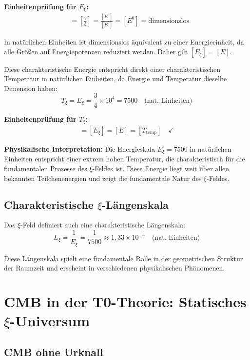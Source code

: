 \documentclass[12pt,a4paper]{article}
\begin{document}
	\textbf{Einheitenprüfung für $E_\xi$:}
	\begin{align}
		[E_\xi] &= \left[\frac{1}{\xi}\right] = \frac{[E^0]}{[E^0]} = [E^0] = \text{dimensionslos}
	\end{align}
	
	In natürlichen Einheiten ist dimensionslos äquivalent zu einer Energieeinheit, da alle Größ{}en auf Energiepotenzen reduziert werden. Daher gilt $[E_\xi] = [E]$.
	
	Diese charakteristische Energie entspricht direkt einer charakteristischen Temperatur in natürlichen Einheiten, da Energie und Temperatur dieselbe Dimension haben:
	\begin{equation}
		T_\xi = E_\xi = \frac{3}{4} \times 10^4 = 7500 \quad \text{(nat. Einheiten)}
	\end{equation}
	
	\textbf{Einheitenprüfung für $T_\xi$:}
	\begin{align}
		[T_\xi] = [E_\xi] = [E] = [T_{\text{temp}}] \quad \checkmark
	\end{align}
	
	\textbf{Physikalische Interpretation:} Die Energieskala $E_\xi = 7500$ in natürlichen Einheiten entspricht einer extrem hohen Temperatur, die charakteristisch für die fundamentalen Prozesse des $\xi$-Feldes ist. Diese Energie liegt weit über allen bekannten Teilchenenergien und zeigt die fundamentale Natur des $\xi$-Feldes.
	
	\subsection{Charakteristische $\xi$-Längenskala}
	
	Das $\xi$-Feld definiert auch eine charakteristische Längenskala:
	\begin{equation}
		L_\xi = \frac{1}{E_\xi} = \frac{1}{7500} \approx 1,33 \times 10^{-4} \quad \text{(nat. Einheiten)}
	\end{equation}
	
	Diese Längenskala spielt eine fundamentale Rolle in der geometrischen Struktur der Raumzeit und erscheint in verschiedenen physikalischen Phänomenen.
	
	\section{CMB in der T0-Theorie: Statisches $\xi$-Universum}
	
	\subsection{CMB ohne Urknall}
	
\end{document}
